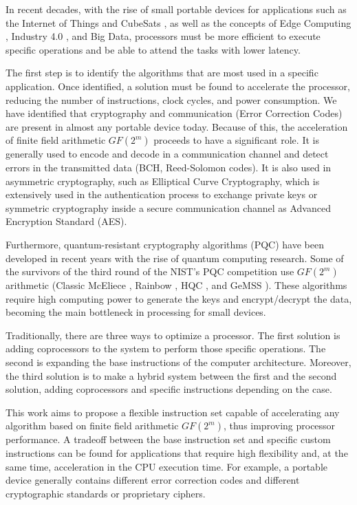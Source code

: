 In recent decades, with the rise of small portable devices for applications such as the Internet of Things \cite{5579543}
and CubeSats \cite{heidt2000cubesat}, as well as the concepts of Edge Computing \cite{7488250}, Industry 4.0 \cite{lasi2014industry}, 
and Big Data, processors must be more efficient to execute specific operations and be able to attend the tasks with lower latency.


The first step is to identify the algorithms that are most used in a specific application. 
Once identified, a solution must be found to accelerate the processor, reducing the number of instructions, 
clock cycles, and power consumption. We have identified that cryptography and communication 
(Error Correction Codes) are present in almost any portable device today. 
Because of this, the acceleration of finite field arithmetic $GF(2^m)$ proceeds to have a significant role. 
It is generally used to encode and decode in a communication channel and detect errors in the transmitted data 
(BCH, Reed-Solomon codes). It is also used in asymmetric cryptography, such as Elliptical Curve Cryptography, 
which is extensively used in the authentication process to exchange private keys or symmetric cryptography 
inside a secure communication channel as Advanced Encryption Standard (AES).


Furthermore, quantum-resistant cryptography algorithms (PQC) \cite{8791343} have been developed in recent years 
with the rise of quantum computing research. Some of the survivors of the third round of the NIST's PQC competition \cite{moody2016post} 
use $GF(2^m)$ arithmetic (Classic McEliece \cite{bernstein2017classic}, Rainbow \cite{10.1007/11496137_12}, HQC \cite{melchor2018hamming}, and GeMSS \cite{casanova2017gemss}). 
These algorithms require high computing power to generate the keys and encrypt/decrypt the data, 
becoming the main bottleneck in processing for small devices.


Traditionally, there are three ways to optimize a processor. The first solution is adding coprocessors 
to the system to perform those specific operations. The second is expanding the base instructions 
of the computer architecture. Moreover, the third solution is to make a hybrid system \cite{4352011} between the first and 
the second solution, adding coprocessors and specific instructions depending on the case. 


This work aims to propose a flexible instruction set 
capable of accelerating any algorithm based on finite field arithmetic $GF(2^m)$, thus improving processor performance. A tradeoff 
between the base instruction set and specific custom instructions can be found for applications that require high flexibility and, 
at the same time, acceleration in the CPU execution time. For example, a portable device generally contains different error correction codes 
and different cryptographic standards or proprietary ciphers.


